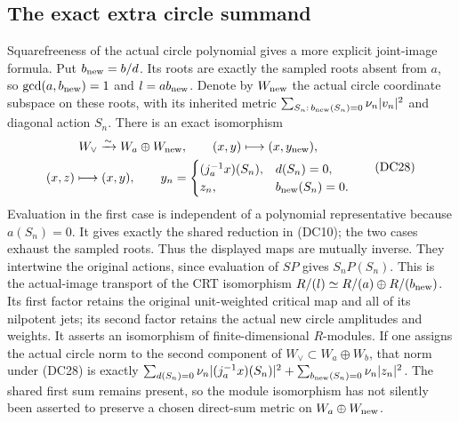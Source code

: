 \subsection{The exact extra circle summand}

Squarefreeness of the actual circle polynomial gives a more explicit
joint-image formula.  Put $b_{\rm new}=b/d$.  Its roots are exactly
the sampled roots absent from $a$, so
$\gcd(a,b_{\rm new})=1$ and $l=ab_{\rm new}$.  Denote by
$W_{\rm new}$ the actual circle coordinate subspace on these
roots, with its inherited metric
$\sum_{S_n:\,b_{\rm new}(S_n)=0}\nu_n|v_n|^2$ and diagonal
action $S_n$.  There is an exact isomorphism
\[
 \begin{gathered}
 W_\vee\xrightarrow{\sim}W_a\oplus W_{\rm new},\qquad
 (x,y)\longmapsto(x,y_{\rm new}),\\
 (x,z)\longmapsto(x,y),\qquad
 y_n=
 \begin{cases}
       (j_a^{-1}x)(S_n),&d(S_n)=0,\\
       z_n,&b_{\rm new}(S_n)=0 .
 \end{cases}
 \end{gathered}
 \tag{DC28}
\]
Evaluation in the first case is independent of a polynomial
representative because $a(S_n)=0$.  It gives exactly the shared
reduction in (DC10); the two cases exhaust the sampled roots.
Thus the displayed maps are mutually inverse.  They intertwine the
original actions, since evaluation of $SP$ gives $S_nP(S_n)$.
This is the actual-image transport of the CRT isomorphism
$R/(l)\simeq R/(a)\oplus R/(b_{\rm new})$.
Its first factor retains the original unit-weighted critical map
and all of its nilpotent jets; its second factor retains the actual
new circle amplitudes and weights.  It asserts an isomorphism of
finite-dimensional $R$-modules.  If one assigns the actual circle
norm to the second component of $W_\vee\subset W_a\oplus W_b$,
that norm under (DC28) is exactly
$\sum_{d(S_n)=0}\nu_n|(j_a^{-1}x)(S_n)|^2+
\sum_{b_{\rm new}(S_n)=0}\nu_n|z_n|^2$.
The shared first sum remains present, so the module isomorphism
has not silently been asserted to preserve a chosen direct-sum
metric on $W_a\oplus W_{\rm new}$.

